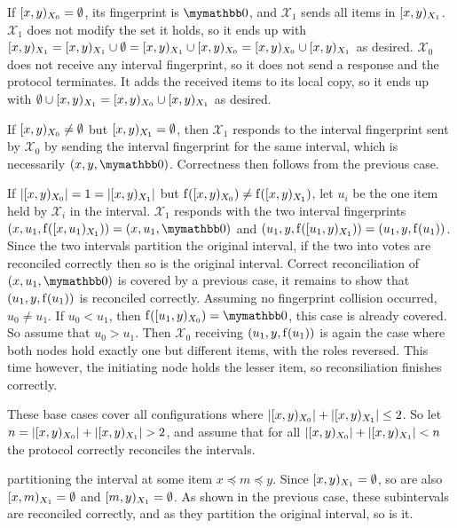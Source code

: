 If $[{x},{y})_{X_0} = \emptyset$, its fingerprint is $\neutraladd$, and $\mathcal{X}_1$ sends all items in $[{x},{y})_{X_1}$. $\mathcal{X}_1$ does not modify the set it holds, so it ends up with $[{x},{y})_{X_1} = [{x},{y})_{X_1} \cup \emptyset = [{x},{y})_{X_1} \cup [{x},{y})_{X_0} = [{x},{y})_{X_0} \cup [{x},{y})_{X_1}$ as desired. $\mathcal{X}_0$ does not receive any interval fingerprint, so it does not send a response and the protocol terminates. It adds the received items to its local copy, so it ends up with $\emptyset \cup [{x},{y})_{X_1} = [{x},{y})_{X_0} \cup [{x},{y})_{X_1}$ as desired.

If $[{x},{y})_{X_0} \neq \emptyset$ but $[{x},{y})_{X_1} = \emptyset$, then $\mathcal{X}_1$ responds to the interval fingerprint sent by $\mathcal{X}_0$ by sending the interval fingerprint for the same interval, which is necessarily $\ifpmanual{x}{y}{\neutraladd}$. Correctness then follows from the previous case.

If $|{[{x},{y})_{X_0}}| = 1 = |{[{x},{y})_{X_1}}|$ but $\operatorname{f}([{x},{y})_{X_0}) \neq \operatorname{f}([{x},{y})_{X_1})$, let $u_i$ be the one item held by $\mathcal{X}_i$ in the interval. $\mathcal{X}_1$ responds with the two interval fingerprints $\ifp{x}{u_1}{X_1} = \ifpmanual{x}{u_1}{\neutraladd}$ and $({u_1}, {y}, {\operatorname{f}([{u_1},{y})_{X_1})}) = ({u_1}, {y}, {\operatorname{f}(u_1)})$. Since the two intervals partition the original interval, if the two into votes are reconciled correctly then so is the original interval. Correct reconciliation of $\ifpmanual{x}{u_1}{\neutraladd}$ is covered by a previous case, it remains to show that $({u_1}, {y}, {\operatorname{f}(u_1)})$ is reconciled correctly. Assuming no fingerprint collision occurred, $u_0 \neq u_1$. If $u_0 < u_1$, then $\fp{\interval{u_1}{y}{X_0}} = \neutraladd$, this case is already covered. So assume that $u_0 > u_1$. Then $\mathcal{X}_0$ receiving $({u_1}, {y}, {\operatorname{f}(u_1)})$ is again the case where both nodes hold exactly one but different items, with the roles reversed. This time however, the initiating node holds the lesser item, so reconsiliation finishes correctly.

These base cases cover all configurations where $|{[{x},{y})_{X_0}}| + |{[{x},{y})_{X_1}}| \leq 2$. So let $n = |{[{x},{y})_{X_0}}| + |{[{x},{y})_{X_1}}| > 2$, and assume that for all $|{[{x},{y})_{X_0}}| + |{[{x},{y})_{X_1}}| < n$ the protocol correctly reconciles the intervals.

 partitioning the interval at some item $x \preceq m \preceq y$. Since $[{x},{y})_{X_1} = \emptyset$, so are also $[{x},{m})_{X_1} = \emptyset$ and $[{m},{y})_{X_1} = \emptyset$. As shown in the previous case, these subintervals are reconciled correctly, and as they partition the original interval, so is it.




